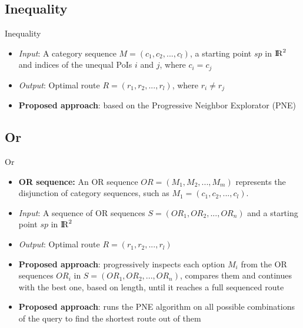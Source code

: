 \documentclass[18pt]{beamer}
\begin{document}
		
					
	\subsection{Inequality}
		\begin{frame}{Inequality}
		
			\begin{itemize}
				\item \textit{Input}: A category sequence $M = (c_1, c_2, ..., c_l)$, a starting point $sp$ in ${\rm I\!R}^2$ and indices of the unequal PoIs $i$ and $j$, where $c_i = c_j$
				\item \textit{Output}: Optimal route $R = (r_1, r_2, ..., r_l)$, where $r_i \neq r_j$ \newline
				\item \textbf{Proposed approach}: based on the Progressive Neighbor Explorator (PNE)
			\end{itemize}
		
		\end{frame}
	
		
	
	\subsection{Or}
		\begin{frame}{Or}
		
			\begin{itemize}
				\item \textbf{OR sequence:} An OR sequence $OR = (M_1, M_2, ..., M_m)$ represents the disjunction of category sequences, such as $M_1 = (c_1, c_2, ..., c_l)$.\newline
				\item \textit{Input}: A sequence of OR sequences $S = (OR_1, OR_2, ..., OR_n)$ and a starting point $sp$ in ${\rm I\!R}^2$
				\item \textit{Output}: Optimal route $R = (r_1, r_2, ..., r_l)$ \newline
				\item \textbf{Proposed approach}: progressively inspects each option $M_i$ from the OR sequences $OR_i$ in \newline $S = (OR_1, OR_2, ..., OR_n)$, compares them and continues with the best one, based on length, until it reaches a full sequenced route
				\item \textbf{Proposed approach}: runs the PNE algorithm on all possible combinations of the query to find the shortest route out of them
			\end{itemize}
		
		\end{frame}
	
\end{document}
